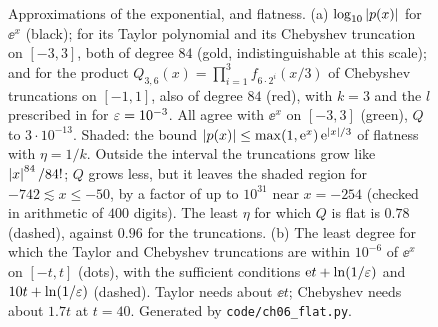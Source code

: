 \documentclass[handoutsbeamer.tex]{subfiles}
\begin{document}
\begin{frame}
{\begin{figure}[tbp]
\caption{Approximations of the exponential, and flatness. (a) $\log_{10}\left\lvert p(x) \right\rvert$ for $\ee^x$ (black); for its Taylor polynomial and its Chebyshev truncation on $[-3,3]$, both of degree $84$ (gold, indistinguishable at this scale); and for the product $Q_{3,6}(x)=\prod_{i=1}^3 f_{6\cdot2^i}(x/3)$ of Chebyshev truncations on $[-1,1]$, also of degree $84$ (red), with $k=3$ and the $l$ prescribed in \citet{wodecki2024learning} for $\varepsilon=10^{-3}$. All agree with $\ee^x$ on $[-3,3]$ (green), $Q$ to $3\cdot10^{-13}$. Shaded: the bound $\left\lvert p(x) \right\rvert\le\max(1,\mathrm{e}^x)\,\mathrm{e}^{\left\lvert x \right\rvert/3}$ of flatness with $\eta=1/k$. Outside the interval the truncations grow like $\left\lvert x \right\rvert^{84}/84!$; $Q$ grows less, but it leaves the shaded region for $-742\lesssim x\le-50$, by a factor of up to $10^{31}$ near $x=-254$ (checked in arithmetic of $400$ digits). The least $\eta$ for which $Q$ is flat is $0.78$ (dashed), against $0.96$ for the truncations. (b) The least degree for which the Taylor and Chebyshev truncations are within $10^{-6}$ of $\ee^x$ on $[-t,t]$ (dots), with the sufficient conditions $\mathrm{e} t+\ln(1/\varepsilon)$ and $10t+\ln(1/\varepsilon)$ (dashed). Taylor needs about $\ee t$; Chebyshev needs about $1.7t$ at $t=40$. Generated by \texttt{code/ch06\_flat.py}.}\label{fig:ch06:flat}
\end{figure}}
\end{frame}
\end{document}
